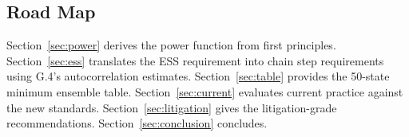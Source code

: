 \subsection{Road Map}

Section~\ref{sec:power} derives the power function from first principles.
Section~\ref{sec:ess} translates the ESS requirement into chain step requirements
using G.4's autocorrelation estimates.
Section~\ref{sec:table} provides the 50-state minimum ensemble table.
Section~\ref{sec:current} evaluates current practice against the new standards.
Section~\ref{sec:litigation} gives the litigation-grade recommendations.
Section~\ref{sec:conclusion} concludes.

